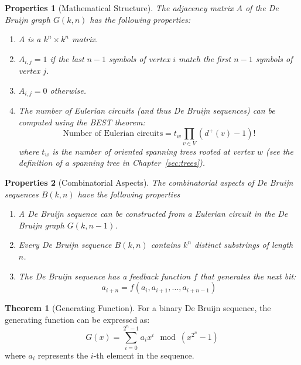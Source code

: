 \documentclass{article}
\newtheorem{properties}{Properties}
\theoremstyle{definition}
\newtheorem{theorem}{Theorem}
\begin{document}
\begin{properties}[Mathematical Structure]
The adjacency matrix $A$ of the De Bruijn graph $G(k, n)$ has the following properties:
\begin{enumerate}
    \item $A$ is a $k^n \times k^n$ matrix.
    \item $A_{i,j} = 1$ if the last $n-1$ symbols of vertex $i$ match the first $n-1$ symbols of vertex $j$.
    \item $A_{i,j} = 0$ otherwise.
    \item The number of Eulerian circuits (and thus De Bruijn sequences) can be computed using the BEST theorem:
    \begin{equation}
        \text{Number of Eulerian circuits} = t_w \prod_{v \in V} (d^+(v) - 1)!
    \end{equation}
    where $t_w$ is the number of oriented spanning trees rooted at vertex $w$ (see the definition of a spanning tree in Chapter~\ref{sec:trees}).
\end{enumerate}
\end{properties}

\begin{properties}[Combinatorial Aspects] The combinatorial aspects of De Bruijn sequences $B(k,n)$ have the following properties
\begin{enumerate}
    \item A De Bruijn sequence can be constructed from a Eulerian circuit in the De Bruijn graph $G(k, n-1)$.
    \item Every De Bruijn sequence $B(k, n)$ contains $k^n$ distinct substrings of length $n$.
    \item The De Bruijn sequence has a feedback function $f$ that generates the next bit:
    \begin{equation}
        a_{i+n} = f(a_i, a_{i+1}, \ldots, a_{i+n-1})
    \end{equation}
\end{enumerate}
\end{properties}
\begin{theorem}[Generating Function]
For a binary De Bruijn sequence, the generating function can be expressed as:
\begin{equation}
    G(x) = \sum_{i=0}^{2^n-1} a_i x^i \mod (x^{2^n} - 1)
\end{equation}
where $a_i$ represents the $i$-th element in the sequence.
\end{theorem}
\end{document}
